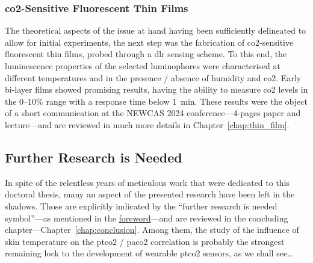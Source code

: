 \subsubsection{\texorpdfstring{\gls{co2}}{CO2}-Sensitive Fluorescent Thin Films}

The theoretical aspects of the issue at hand having been sufficiently delineated to allow for initial \invitro{} experiments, the next step was the fabrication of \gls{co2}-sensitive fluorescent thin films, probed through a \gls{dlr} sensing scheme. To this end, the luminescence properties of the selected luminophores were characterised at different temperatures and in the presence / absence of humidity and \gls{co2}. Early bi-layer films showed promising results, having the ability to measure \gls{co2} levels in the 0--10\% range with a response time below 1~min. These results were the object of a short communication at the NEWCAS 2024 conference\cite{dervieux2024newcas}---4-pages paper and lecture---and are reviewed in much more details in Chapter~\ref{chap:thin_film}.

\subsection{Further Research is Needed}

\mfrin{}In spite of the relentless years of meticulous work that were dedicated to this doctoral thesis, many an aspect of the presented research have been left in the shadows. Those are explicitly indicated by the \enquote{further research is needed symbol}---as mentioned in the \hyperref[forechap:foreword]{foreword}---and are reviewed in the concluding chapter---Chapter~\ref{chap:conclusion}. Among them, the study of the influence of skin temperature on the \gls{ptco2} / \gls{paco2} correlation is probably the strongest remaining lock to the development of wearable \gls{ptco2} sensors, as we shall see\dots











